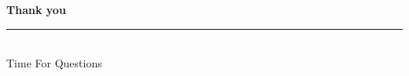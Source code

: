 \documentclass[aspectratio=169,11pt,c]{beamer}
\begin{document}
\begin{frame}
  \begin{center}
    \vfill
    {\color{primaryblue}\bfseries\huge Thank you}\\[10pt]
    {\color{accentorange}\rule{0.28\paperwidth}{1.4pt}}\\[10pt]
    {\color{midgray}\normalsize Time For Questions}
    \vfill
  \end{center}
\end{frame}
\end{document}
